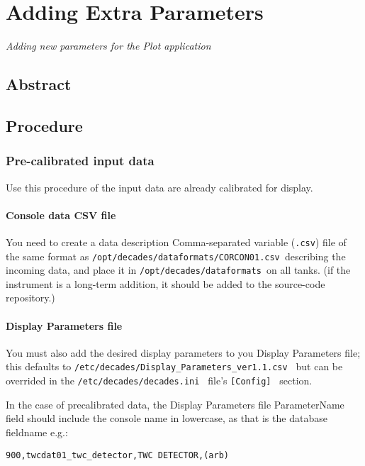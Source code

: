 

\chapter{Adding Extra Parameters}
\begin{center}
{\small\em Adding new parameters for the Plot application}
\end{center}

\section{Abstract}

\section{Procedure}

\subsection{Pre-calibrated input data}
Use this procedure of the input data are already calibrated for display. 
\subsubsection{Console data CSV file}
You need to create a data description Comma-separated variable ({\tt .csv}) file 
of the same format as {\tt /opt/decades/dataformats/CORCON01.csv }describing the
incoming data, and place it in {\tt /opt/decades/dataformats }on all tanks. (if 
the instrument is a long-term addition, it should be added to the source-code 
repository.)
\subsubsection{Display Parameters file}
You must also add the desired display parameters to you Display Parameters file;
this defaults to {\tt /etc/decades/Display\_Parameters\_ver1.1.csv } but can be
overrided in the {\tt /etc/decades/decades.ini } file's {\tt [Config] } section.

In the case of precalibrated data, the Display Parameters file ParameterName field
should include the console name in lowercase, as that is the database fieldname e.g.:

\begin{center}
{\tt 900,twcdat01\_twc\_detector,TWC DETECTOR,(arb) }
\end{center}

\newpage
